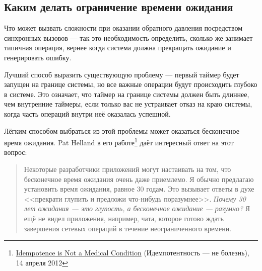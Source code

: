 \documentclass[11pt, oneside]{book}   	%
\begin{document}
  
\subsection{Каким делать ограничение времени ожидания}

Что может вызвать сложности при оказании обратного давления посредством синхронных вызовов --- так это необходимость определить, сколько же занимает типичная операция, вернее когда система должна прекращать ожидание и генерировать ошибку.

Лучший способ выразить существующую проблему --- первый таймер будет запущен на границе системы, но все важные операции будут происходить глубоко в системе. Это означает, что таймер на границе системы должен быть длиннее, чем внутренние таймеры, если только вас не устраивает отказ на краю системы, когда часть операций внутри неё оказалась успешной.

Лёгким способом выбраться из этой проблемы может оказаться бесконечное время ожидания. Pat Helland в его работе\footnote{\href{http://queue.acm.org/detail.cfm?id=2187821}{Idempotence is Not a Medical Condition} (Идемпотентность --- не болезнь), 14 апреля 2012} даёт интересный ответ на этот вопрос:

\begin{quote}
Некоторые разработчики приложений могут настаивать на том, что бесконечное время ожидания очень даже приемлемо. Я обычно предлагаю установить время ожидания, равное 30 годам. Это вызывает ответы в духе <<прекрати глупить и предложи что-нибудь поразумнее>>. \emph{Почему 30 лет ожидания --- это глупость, а бесконечное ожидание --- разумно?} Я ещё не видел приложения, например, чата, которое готово ждать завершения сетевых операций в течение неограниченного времени.
\end{quote}
\end{document}
